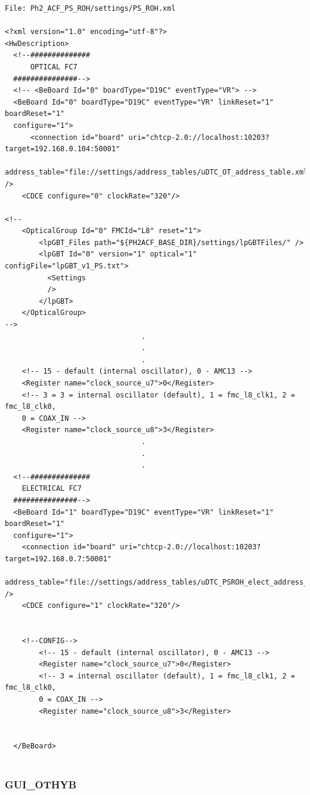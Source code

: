 \documentclass[10pt,a4paper]{article}
\begin{document}
\begin{framed}
\begin{verbatim}
File: Ph2_ACF_PS_ROH/settings/PS_ROH.xml

<?xml version="1.0" encoding="utf-8"?>
<HwDescription>
  <!--##############
      OPTICAL FC7
  ###############-->
  <!-- <BeBoard Id="0" boardType="D19C" eventType="VR"> -->
  <BeBoard Id="0" boardType="D19C" eventType="VR" linkReset="1" boardReset="1"
  configure="1">
      <connection id="board" uri="chtcp-2.0://localhost:10203?target=192.168.0.104:50001" 
      address_table="file://settings/address_tables/uDTC_OT_address_table.xml" />
    <CDCE configure="0" clockRate="320"/>

<!--
    <OpticalGroup Id="0" FMCId="L8" reset="1">
        <lpGBT_Files path="${PH2ACF_BASE_DIR}/settings/lpGBTFiles/" />
        <lpGBT Id="0" version="1" optical="1" configFile="lpGBT_v1_PS.txt">
          <Settings
          />
        </lpGBT>
    </OpticalGroup>
-->
                                .
                                .
                                .                                
    <!-- 15 - default (internal oscillator), 0 - AMC13 -->
    <Register name="clock_source_u7">0</Register>
    <!-- 3 = 3 = internal oscillator (default), 1 = fmc_l8_clk1, 2 = fmc_l8_clk0, 
    0 = COAX_IN -->
    <Register name="clock_source_u8">3</Register>   
                                .
                                .
                                .
  <!--##############
    ELECTRICAL FC7
  ###############-->
  <BeBoard Id="1" boardType="D19C" eventType="VR" linkReset="1" boardReset="1" 
  configure="1">
    <connection id="board" uri="chtcp-2.0://localhost:10203?target=192.168.0.7:50001" 
    address_table="file://settings/address_tables/uDTC_PSROH_elect_address_table.xml" />
    <CDCE configure="1" clockRate="320"/>


    <!--CONFIG-->
        <!-- 15 - default (internal oscillator), 0 - AMC13 -->
        <Register name="clock_source_u7">0</Register>
        <!-- 3 = internal oscillator (default), 1 = fmc_l8_clk1, 2 = fmc_l8_clk0,
        0 = COAX_IN -->
        <Register name="clock_source_u8">3</Register>


  </BeBoard>


\end{verbatim}
\end{framed}

\subsubsection{GUI\_OTHYB}
\label{gui}
\end{document}
